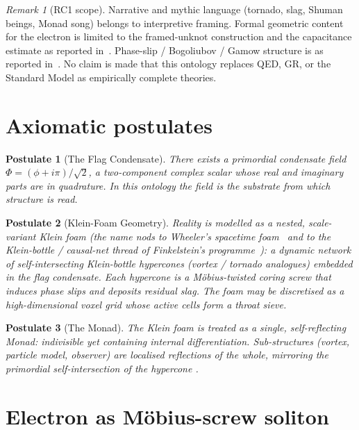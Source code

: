 \documentclass[11pt,a4paper]{article}
\newtheorem{postulate}{Postulate}[section]
\theoremstyle{definition}
\theoremstyle{remark}
\newtheorem{remark}{Remark}[section]
\begin{document}
\begin{remark}[RC1 scope]
Narrative and mythic language (tornado, slag, Shuman beings, Monad song)
belongs to interpretive framing.  Formal geometric content for the
electron is limited to the framed-unknot construction and the
capacitance estimate as reported in~\cite{Mobius2026}.  Phase-slip /
Bogoliubov / Gamow structure is as reported in~\cite{FlagDecay2026}.
No claim is made that this ontology replaces QED, GR, or the Standard
Model as empirically complete theories.
\end{remark}

\section{Axiomatic postulates}
\label{sec:axioms}

\begin{postulate}[The Flag Condensate]
There exists a primordial condensate field
$\Phi = (\phi + i\pi)/\sqrt{2}$, a two-component complex scalar whose
real and imaginary parts are in quadrature.  In this ontology the field
is the substrate from which structure is read.
\end{postulate}

\begin{postulate}[Klein-Foam Geometry]
Reality is modelled as a nested, scale-variant \emph{Klein foam}
(the name nods to Wheeler's spacetime foam~\cite{Wheeler} and to the
Klein-bottle / causal-net thread of Finkelstein's
programme~\cite{Finkelstein}): a
dynamic network of self-intersecting Klein-bottle hypercones
(vortex / tornado analogues) embedded in the flag condensate.  Each
hypercone is a M\"obius-twisted coring screw that induces phase slips
and deposits residual slag.  The foam may be discretised as a
high-dimensional voxel grid whose active cells form a throat sieve.
\end{postulate}

\begin{postulate}[The Monad]
The Klein foam is treated as a single, self-reflecting Monad: indivisible
yet containing internal differentiation.  Sub-structures (vortex,
particle model, observer) are localised reflections of the whole,
mirroring the primordial self-intersection of the hypercone
\cite{Leibniz}.
\end{postulate}

\section{Electron as M\"obius-screw soliton}
\label{sec:electron}
\end{document}

